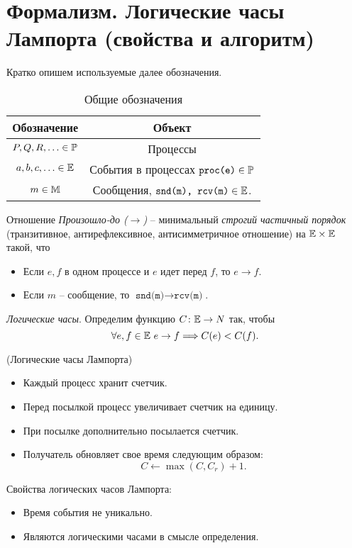 \section{Формализм. Логические часы Лампорта (свойства и алгоритм)}

Кратко опишем используемые далее обозначения.

\begin{table}[!ht]
    \centering
    \begin{tabular}{|c|c|} \hline
        Обозначение & Объект \\ \hline
        $P, Q, R, \ldots \in \mathbb{P}$ & Процессы \\ \hline
        $a, b, c, \ldots \in \mathbb{E}$ & События в процессах $\texttt{proc(e)} \in \mathbb{P}$
        \\ \hline
        $m \in \mathbb{M}$ & Сообщения, $\texttt{snd(m), rcv(m)} \in \mathbb{E}$. \\ \hline
    \end{tabular}
    \caption{Общие обозначения}
\end{table}

\begin{definition}
    Отношение \textit{Произошло-до ($\rightarrow$)} -- минимальный
    \textit{строгий частичный порядок} (транзитивное, антирефлексивное,
    антисимметричное отношение) на $\mathbb{E} \times \mathbb{E}$ такой, что
    \begin{itemize}
        \item Если $e, f$ в одном процессе и $e$ идет перед $f$, то $e \rightarrow f$.
        \item Если $m$ -- сообщение, то $\texttt{snd(m)} \rightarrow \texttt{rcv(m)}$.
    \end{itemize}
\end{definition}

\begin{definition}
    \textit{Логические часы}. Определим функцию $C \colon \mathbb{E} \to N$ так, чтобы
\[
    \forall e, f \in \mathbb{E}~ e \rightarrow f \Longrightarrow C(e) < C(f)
.\]
\end{definition}

\begin{algorithm}(Логические часы Лампорта)
    \begin{itemize}
        \item Каждый процесс хранит счетчик.
        \item Перед посылкой процесс увеличивает счетчик на единицу.
        \item При посылке дополнительно посылается счетчик.
        \item Получатель обновляет свое время следующим образом:
            \[
                C \leftarrow \max(C, C_r) + 1
            .\]
    \end{itemize}
\end{algorithm}

Свойства логических часов Лампорта: 
\begin{itemize}
    \item Время события не уникально.
    \item Являются логическими часами в смысле определения.
\end{itemize}

